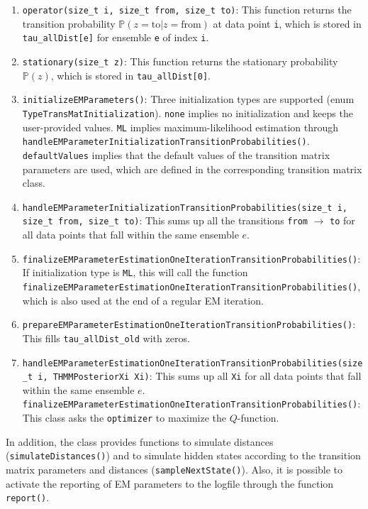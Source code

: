 \documentclass[a4paper,11pt]{article}
\def\p{\mathbb{P}}
\newcommand{\privparam}[1]{\texttt{\textunderscore #1}}
\newcommand{\func}[1]{\texttt{#1}}
\newcommand{\pubfunc}[1]{\texttt{#1()}}
\newcommand{\variable}[1]{\texttt{#1}}
\newcommand{\enum}[1]{\texttt{#1}}
\begin{document}
\begin{enumerate}
\item \func{operator(size\_t i, size\_t from, size\_t to)}: This function returns the transition probability $\p(z = \mbox{to} | z = \mbox{from})$ at data point \variable{i}, which is stored in \privparam{tau\_allDist[e]} for ensemble \variable{e} of index \variable{i}.

\item \func{stationary(size\_t z)}: This function returns the stationary probability $\p(z)$, which is stored in \privparam{tau\_allDist[0]}.
\item \pubfunc{initializeEMParameters}: Three initialization types are supported (enum \enum{TypeTransMatInitialization}). \enum{none} implies no initialization and keeps the user-provided values. \enum{ML} implies maximum-likelihood estimation through \pubfunc{handleEMParameterInitializationTransitionProbabilities}. \enum{defaultValues} implies that the default values of the transition matrix parameters are used, which are defined in the corresponding transition matrix class.
\item \func{handleEMParameterInitializationTransitionProbabilities(size\_t i, size\_t from, size\_t to)}: This sums up all the transitions \variable{from} $\to$ \variable{to} for all data points that fall within the same ensemble $e$.
\item \pubfunc{finalizeEMParameterEstimationOneIterationTransitionProbabilities}: If initialization type is \enum{ML}, this will call the function \pubfunc{finalizeEMParameterEstimationOneIterationTransitionProbabilities}, which is also used at the end of a regular EM iteration.
\item \pubfunc{prepareEMParameterEstimationOneIterationTransitionProbabilities}: This fills \privparam{tau\_allDist\_old} with zeros.
 \item \func{handleEMParameterEstimationOneIterationTransitionProbabilities(size\_t i, THMMPosteriorXi Xi)}: This sums up all \variable{Xi} for all data points that fall within the same ensemble $e$.
 \pubfunc{finalizeEMParameterEstimationOneIterationTransitionProbabilities}: This class asks the \privparam{optimizer} to maximize the $Q$-function.
\end{enumerate}

In addition, the class provides functions to simulate distances (\pubfunc{simulateDistances}) and to simulate hidden states according to the transition matrix parameters and distances (\pubfunc{sampleNextState}). Also, it is possible to activate the reporting of EM parameters to the logfile through the function \pubfunc{report}.
\end{document}

